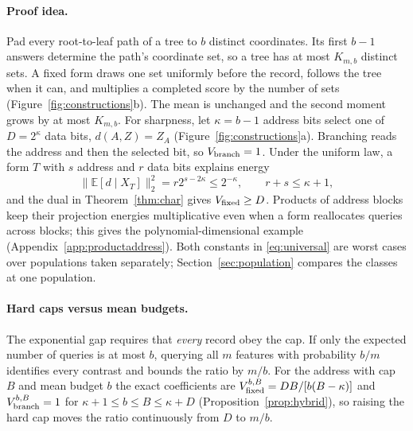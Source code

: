 \documentclass{article}
\newcommand{\E}{\mathbb{E}}
\begin{document}
\paragraph{Proof idea.}
Pad every root-to-leaf path of a tree to $b$ distinct coordinates. Its first $b-1$ answers determine the path's coordinate set, so a tree has at most $K_{m,b}$ distinct sets. A fixed form draws one set uniformly before the record, follows the tree when it can, and multiplies a completed score by the number of sets (Figure~\ref{fig:constructions}b). The mean is unchanged and the second moment grows by at most $K_{m,b}$. For sharpness, let $\kappa=b-1$ address bits select one of $D=2^\kappa$ data bits, $d(A,Z)=Z_A$ (Figure~\ref{fig:constructions}a). Branching reads the address and then the selected bit, so $V_{\rm branch}=1$. Under the uniform law, a form $T$ with $s$ address and $r$ data bits explains energy
\begin{equation}
 \|\E[d\mid X_T]\|_2^2=r2^{s-2\kappa}\le2^{-\kappa},\qquad r+s\le\kappa+1,\label{eq:addressinformation}
\end{equation}
and the dual in Theorem~\ref{thm:char} gives $V_{\rm fixed}\ge D$. Products of address blocks keep their projection energies multiplicative even when a form reallocates queries across blocks; this gives the polynomial-dimensional example (Appendix~\ref{app:productaddress}). Both constants in \eqref{eq:universal} are worst cases over populations taken separately; Section~\ref{sec:population} compares the classes at one population.

\paragraph{Hard caps versus mean budgets.}
The exponential gap requires that \emph{every} record obey the cap. If only the expected number of queries is at most $b$, querying all $m$ features with probability $b/m$ identifies every contrast and bounds the ratio by $m/b$. For the address with cap $B$ and mean budget $b$ the exact coefficients are $V^{b,B}_{\rm fixed}=DB/[b(B-\kappa)]$ and $V^{b,B}_{\rm branch}=1$ for $\kappa+1\le b\le B\le\kappa+D$ (Proposition~\ref{prop:hybrid}), so raising the hard cap moves the ratio continuously from $D$ to $m/b$.
\end{document}
